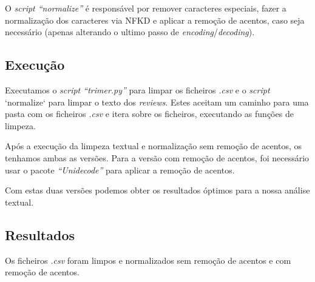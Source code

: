O \textit{script ``normalize''} é responsável por remover caracteres especiais, fazer a normalização dos caracteres via NFKD e aplicar a remoção de acentos, caso seja necessário (apenas alterando o ultimo passo de \textit{encoding}/\textit{decoding}).

\subsection{Execução}

Executamos o \textit{script ``trimer.py''} para limpar os ficheiros \textit{.csv} e o \textit{script} `normalize` para limpar o texto dos \textit{reviews}. Estes aceitam um caminho para uma pasta com os ficheiros \textit{.csv} e itera sobre os ficheiros, executando as funções de limpeza.

Após a execução da limpeza textual e normalização sem remoção de acentos, os tenhamos ambas as versões. Para a versão com remoção de acentos, foi necessário usar o pacote \textit{``Unidecode''} para aplicar a remoção de acentos.

Com estas duas versões podemos obter os resultados óptimos para a nossa análise textual.

\subsection{Resultados}

Os ficheiros \textit{.csv} foram limpos e normalizados sem remoção de acentos e com remoção de acentos.
